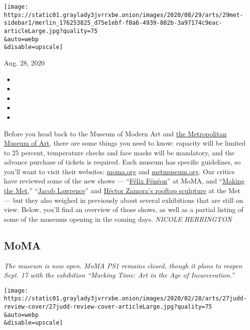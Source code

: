 \texttt{[image: https://static01.graylady3jvrrxbe.onion/images/2020/08/29/arts/29met-sidebar1/merlin\_176253825\_d75e1ebf-f8a6-4939-802b-3a97174c9eac-articleLarge.jpg?quality=75\\\&auto=webp\\\&disable=upscale]}

Aug. 28, 2020

\begin{itemize}
\item
\item
\item
\item
\item
\end{itemize}

Before you head back to the Museum of Modern Art and
\href{https://www.nytimes3xbfgragh.onion/2020/08/25/arts/design/met-museum-reopening.html}{the
Metropolitan Museum of Art}, there are some things you need to know:
capacity will be limited to 25 percent, temperature checks and face
masks will be mandatory, and the advance purchase of tickets is
required. Each museum has specific guidelines, so you'll want to visit
their websites: \href{https://www.moma.org/}{moma.org} and
\href{https://www.metmuseum.org/}{metmuseum.org}. Our critics have
reviewed some of the new shows ---
``\href{https://www.nytimes3xbfgragh.onion/2020/08/27/arts/design/moma-reopens-felix-feneon.html}{Félix
Fénéon}'' at MoMA, and
``\href{https://www.nytimes3xbfgragh.onion/2020/08/27/arts/design/met-museum-reopens-anniversary.html}{Making
the Met,}''
``\href{https://www.nytimes3xbfgragh.onion/2020/08/27/arts/design/jacob-lawrence-metropolitan-museum.html}{Jacob
Lawrence}'' and
\href{https://www.nytimes3xbfgragh.onion/2020/08/27/arts/design/met-roof-hector-zamora-wall.html}{Héctor
Zamora's rooftop sculpture} at the Met --- but they also weighed in
previously about several exhibitions that are still on view. Below,
you'll find an overview of those shows, as well as a partial listing of
some of the museums opening in the coming days. \emph{NICOLE HERRINGTON}

\hypertarget{moma}{%
\subsection{MoMA}\label{moma}}

\emph{The museum is now open. MoMA PS1 remains closed, though it plans
to reopen Sept. 17 with the exhibition ``Marking Time: Art in the Age of
Incarceration.''}

\texttt{[image: https://static01.graylady3jvrrxbe.onion/images/2020/02/28/arts/27judd-review-cover/27judd-review-cover-articleLarge.jpg?quality=75\\\&auto=webp\\\&disable=upscale]}


